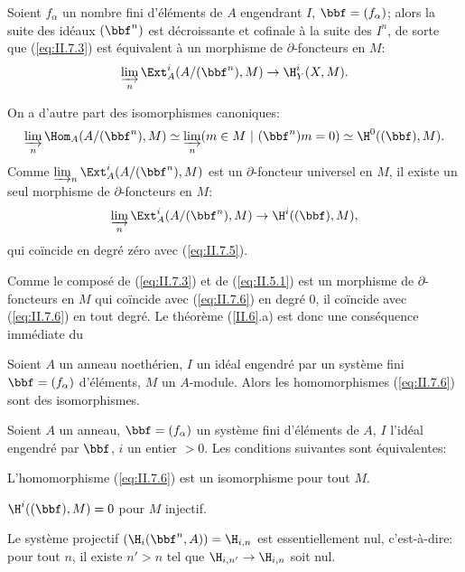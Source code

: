 Soient $f_{\alpha}$ un nombre fini d'\'el\'ements de $A$ engendrant $I$, $\bbf=(f_{\alpha})$; alors la suite des id\'eaux $(\bbf^n)$ est d\'ecroissante et cofinale \`a la suite des $I^n$, de sorte que (\ref{eq:II.7.3}) est \'equivalent \`a un morphisme de $\partial$-foncteurs en $M$:
\begin{equation} \label{eq:II.7.4} \varinjlim_{n} \Ext_A^i(A/(\bbf^n), M) \to \H_Y^i(X, M).
\end{equation}

On a d'autre part des isomorphismes canoniques:
\begin{equation} \label{eq:II.7.5} \varinjlim_{n} \Hom_A(A/(\bbf^n), M) \simeq \varinjlim_{n} (m\in M\ |\ (\bbf^n)m=0) \simeq \H^0((\bbf), M).
\end{equation}
Comme $\varinjlim_{n} \Ext_A^i(A/(\bbf^n), M)$ est un $\partial$-foncteur universel en $M$, il existe un seul morphisme de $\partial$-foncteurs en $M$:
\begin{equation} \label{eq:II.7.6} \varinjlim_{n} \Ext_A^i(A/(\bbf^n), M) \to \H^i((\bbf), M),
\end{equation}
qui co\"incide en degr\'e z\'ero avec (\ref{eq:II.7.5}).

Comme le compos\'e de (\ref{eq:II.7.3}) et de (\ref{eq:II.5.1}) est un morphisme de $\partial$-foncteurs en $M$ qui co\"incide avec (\ref{eq:II.7.6}) en degr\'e $0$, il co\"incide avec (\ref{eq:II.7.6}) en tout degr\'e. Le th\'eor\`eme (\ref{II.6}.a) est donc une cons\'equence imm\'ediate du

\begin{suplemme} \label{II.8}
Soient $A$ un anneau noeth\'erien, $I$ un id\'eal engendr\'e par un syst\`eme fini $\bbf=(f_{\alpha})$ d'\'el\'ements, $M$ un $A$-module. Alors les homomorphismes (\ref{eq:II.7.6}) sont des isomorphismes.
\end{suplemme}

\begin{suplemme} \label{II.9}
Soient $A$ un anneau, $\bbf=(f_{\alpha})$ un syst\`eme fini d'\'el\'ements de $A$, $I$ l'id\'eal engendr\'e par $\bbf$, $i$ un entier $>0$. Les conditions suivantes sont \'equivalentes:
\begin{enumeratea}
\item
L'homomorphisme (\ref{eq:II.7.6}) est un isomorphisme pour tout $M$.
\item
$\H^i((\bbf), M)=0$ pour $M$ injectif.
\item
Le syst\`eme projectif $(\H_i(\bbf^n, A))=\H_{i, n}$ est essentiellement nul, c'est-\`a-dire: pour tout $n$, il existe $n'>n$ tel que $\H_{i, n'}\to\H_{i, n}$ soit nul.
\end{enumeratea}
\end{suplemme}

